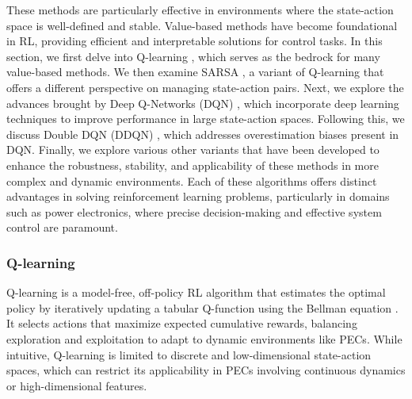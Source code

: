 These methods are particularly effective in environments where the state-action space is well-defined and stable. Value-based methods have become foundational in RL, providing efficient and interpretable solutions for control tasks. In this section, we first delve into Q-learning \cite{watkins1992q}, which serves as the bedrock for many value-based methods. We then examine SARSA \cite{rummery1994line}, a variant of Q-learning that offers a different perspective on managing state-action pairs. Next, we explore the advances brought by Deep Q-Networks (DQN) \cite{van2016deep}, which incorporate deep learning techniques to improve performance in large state-action spaces. Following this, we discuss Double DQN (DDQN) \cite{wang2016dueling}, which addresses overestimation biases present in DQN. Finally, we explore various other variants that have been developed to enhance the robustness, stability, and applicability of these methods in more complex and dynamic environments. Each of these algorithms offers distinct advantages in solving reinforcement learning problems, particularly in domains such as power electronics, where precise decision-making and effective system control are paramount.

\subsubsection{Q-learning}

Q-learning is a model-free, off-policy RL algorithm that estimates the optimal policy by iteratively updating a tabular Q-function using the Bellman equation \cite{watkins1992q}. It selects actions that maximize expected cumulative rewards, balancing exploration and exploitation to adapt to dynamic environments like PECs. While intuitive, Q-learning is limited to discrete and low-dimensional state-action spaces, which can restrict its applicability in PECs involving continuous dynamics or high-dimensional features.

